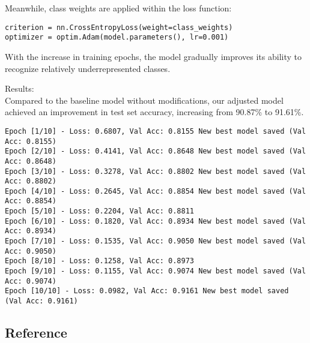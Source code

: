 Meanwhile, class weights are applied within the loss function:

\begin{verbatim}
criterion = nn.CrossEntropyLoss(weight=class_weights)  
optimizer = optim.Adam(model.parameters(), lr=0.001)
\end{verbatim}

With the increase in training epochs, the model gradually improves its
ability to recognize relatively underrepresented classes.

Results:\\
Compared to the baseline model without modifications, our adjusted model
achieved an improvement in test set accuracy, increasing from 90.87\% to
91.61\%.

\begin{verbatim}
Epoch [1/10] - Loss: 0.6807, Val Acc: 0.8155 New best model saved (Val Acc: 0.8155)
Epoch [2/10] - Loss: 0.4141, Val Acc: 0.8648 New best model saved (Val Acc: 0.8648)
Epoch [3/10] - Loss: 0.3278, Val Acc: 0.8802 New best model saved (Val Acc: 0.8802)
Epoch [4/10] - Loss: 0.2645, Val Acc: 0.8854 New best model saved (Val Acc: 0.8854)
Epoch [5/10] - Loss: 0.2204, Val Acc: 0.8811 
Epoch [6/10] - Loss: 0.1820, Val Acc: 0.8934 New best model saved (Val Acc: 0.8934)
Epoch [7/10] - Loss: 0.1535, Val Acc: 0.9050 New best model saved (Val Acc: 0.9050)
Epoch [8/10] - Loss: 0.1258, Val Acc: 0.8973 
Epoch [9/10] - Loss: 0.1155, Val Acc: 0.9074 New best model saved (Val Acc: 0.9074)
Epoch [10/10] - Loss: 0.0982, Val Acc: 0.9161 New best model saved (Val Acc: 0.9161)
\end{verbatim}

\subsection{Reference}\label{reference}

